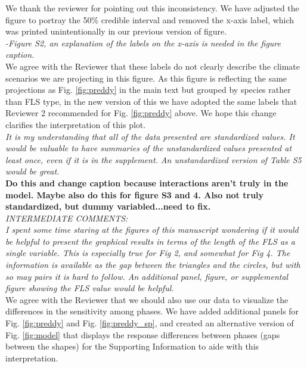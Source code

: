 \documentclass[11pt]{article}
\begin{document}
\noident We thank the reviewer for pointing out this inconsistency. We have adjusted the figure to portray the 50\% credible interval and removed the x-axis label, which was printed unintentionally in our previous version of figure.\\

\emph{-Figure S2, an explanation of the labels on the x-axis is needed in the figure caption.}\\

\noindent We agree with the Reviewer that these labels do not clearly describe the climate scenarios we are projecting in this figure. As this figure is reflecting the same projections as Fig. \ref{fig:preddy} in the main text but grouped by species rather than FLS type, in the new version of this we have adopted the same labels that Reviewer 2 recommended for Fig. \ref{fig:preddy} above. We hope this change clarifies the interpretation of this plot.\\


\emph{It is my understanding that all of the data presented are standardized values. It would be valuable to have summaries of the unstandardized values presented at least once, even if it is in the supplement. An unstandardized version of Table S5 would be great.}\\

\textbf{Do this and change caption because interactions aren't truly in the model. Maybe also do this for figure S3 and 4. Also not truly standardized, but dummy variabled...need to fix.}\\ 


\emph{INTERMEDIATE COMMENTS:}\\
\emph{I spent some time staring at the figures of this manuscript wondering if it would be helpful to present the graphical results in terms of the length of the FLS as a single variable. This is especially true for Fig 2, and somewhat for Fig 4. The information is available as the gap between the triangles and the circles, but with so may pairs it is hard to follow. An additional panel, figure, or supplemental figure showing the FLS value would be helpful.}\\

We agree with the Reviewer that we should also use our data to visualize the differences in the sensitivity among phases. We have added additional panels for Fig. \ref{fig:preddy} and Fig. \ref{fig:preddy_sp}, and created an alternative version of Fig. \ref{fig:model} that displays the response differences between phases (gaps between the shapes) for the Supporting Information to aide with this interpretation.\\
\end{document}
